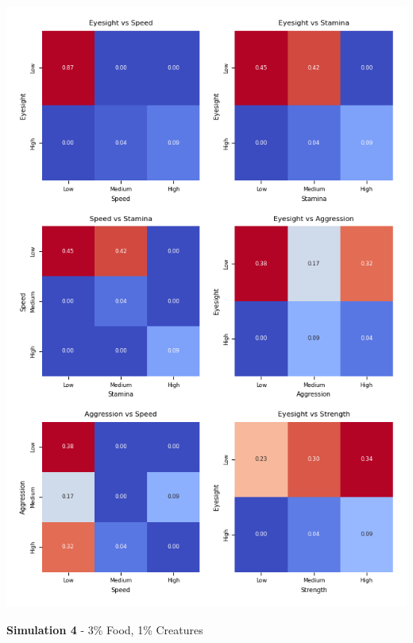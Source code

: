 \documentclass{article}
\begin{document}
\begin{center}
    \includegraphics[scale=0.9]{tests/2.3_confusion_matrices.png}
\end{center}
\textbf{Simulation 4} - 3\% Food, 1\% Creatures
\end{document}
